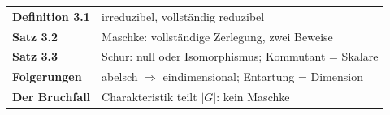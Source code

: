 \begin{merksatz}
\begin{center}
\renewcommand{\arraystretch}{1.5}
\begin{tabular}{@{}P{3.0cm}P{5.6cm}@{}}
\toprule
\textbf{Definition 3.1} & irreduzibel, vollständig reduzibel\\
\textbf{Satz 3.2} & Maschke: vollständige Zerlegung, zwei Beweise\\
\textbf{Satz 3.3} & Schur: null oder Isomorphismus; Kommutant = Skalare\\
\textbf{Folgerungen} & abelsch $\Rightarrow$ eindimensional; Entartung = Dimension\\
\textbf{Der Bruchfall} & Charakteristik teilt $|G|$: kein Maschke\\
\bottomrule
\end{tabular}
\end{center}

\begin{center}
\begin{minipage}{0.88\textwidth}
\end{minipage}
\end{center}
\end{merksatz}
